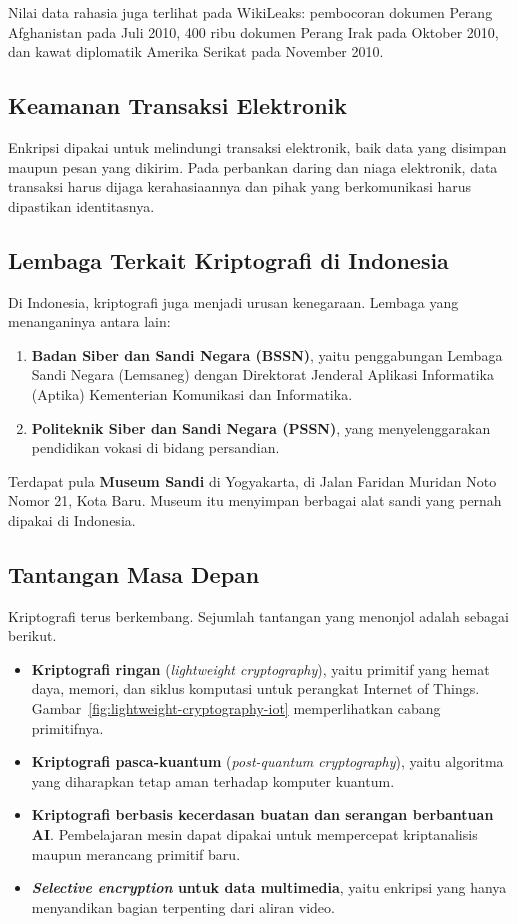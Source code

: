 Nilai data rahasia juga terlihat pada WikiLeaks: pembocoran dokumen Perang
Afghanistan pada Juli 2010, 400 ribu dokumen Perang Irak pada Oktober 2010, dan
kawat diplomatik Amerika Serikat pada November 2010.

\subsection{Keamanan Transaksi Elektronik}

Enkripsi dipakai untuk melindungi transaksi elektronik, baik data yang disimpan
maupun pesan yang dikirim. Pada perbankan daring dan niaga elektronik, data
transaksi harus dijaga kerahasiaannya dan pihak yang berkomunikasi harus
dipastikan identitasnya.

\subsection{Lembaga Terkait Kriptografi di Indonesia}

Di Indonesia, kriptografi juga menjadi urusan kenegaraan. Lembaga yang
menanganinya antara lain:
\begin{enumerate}
    \item \textbf{Badan Siber dan Sandi Negara (BSSN)}, yaitu penggabungan
          Lembaga Sandi Negara (Lemsaneg) dengan Direktorat Jenderal Aplikasi
          Informatika (Aptika) Kementerian Komunikasi dan Informatika.
    \item \textbf{Politeknik Siber dan Sandi Negara (PSSN)}, yang
          menyelenggarakan pendidikan vokasi di bidang persandian.
\end{enumerate}

Terdapat pula \textbf{Museum Sandi} di Yogyakarta, di Jalan Faridan Muridan Noto
Nomor 21, Kota Baru. Museum itu menyimpan berbagai alat sandi yang pernah
dipakai di Indonesia.

\subsection{Tantangan Masa Depan}

Kriptografi terus berkembang. Sejumlah tantangan yang menonjol adalah sebagai
berikut.
\begin{itemize}
    \item \textbf{Kriptografi ringan} (\textit{lightweight cryptography}),
          yaitu primitif yang hemat daya, memori, dan siklus komputasi untuk
          perangkat Internet of Things. Gambar~\ref{fig:lightweight-cryptography-iot}
          memperlihatkan cabang primitifnya.
    \item \textbf{Kriptografi pasca-kuantum} (\textit{post-quantum
          cryptography}), yaitu algoritma yang diharapkan tetap aman terhadap
          komputer kuantum.
    \item \textbf{Kriptografi berbasis kecerdasan buatan dan serangan berbantuan
          AI}. Pembelajaran mesin dapat dipakai untuk mempercepat kriptanalisis
          maupun merancang primitif baru.
    \item \textbf{\textit{Selective encryption} untuk data multimedia}, yaitu
          enkripsi yang hanya menyandikan bagian terpenting dari aliran video.
\end{itemize}

